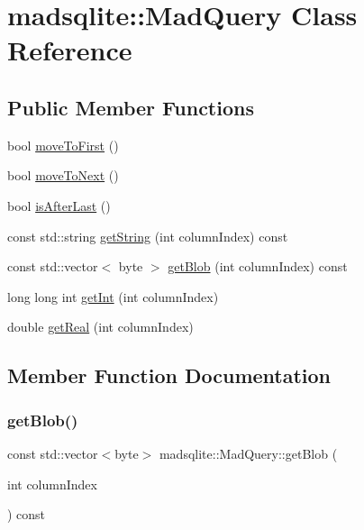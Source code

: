 \hypertarget{classmadsqlite_1_1_mad_query}{}\section{madsqlite\+:\+:Mad\+Query Class Reference}
\label{classmadsqlite_1_1_mad_query}
\subsection*{Public Member Functions}
\begin{DoxyCompactItemize}
\item 
bool \hyperlink{classmadsqlite_1_1_mad_query_a37a601031ecedf20e53b8c0f610f74b0}{move\+To\+First} ()
\item 
bool \hyperlink{classmadsqlite_1_1_mad_query_a2eecba50378a4577803aff41671829fe}{move\+To\+Next} ()
\item 
bool \hyperlink{classmadsqlite_1_1_mad_query_a0fa757aa8333e3fc53c57442bdf4cad7}{is\+After\+Last} ()
\item 
const std\+::string \hyperlink{classmadsqlite_1_1_mad_query_a63b55fe68d013c3d1fdade2391233cb9}{get\+String} (int column\+Index) const
\item 
const std\+::vector$<$ byte $>$ \hyperlink{classmadsqlite_1_1_mad_query_ade5b4bc30c7876eeeb62e2f0bb8fc111}{get\+Blob} (int column\+Index) const
\item 
long long int \hyperlink{classmadsqlite_1_1_mad_query_ab04d59c89fccfd773f77276219f4d376}{get\+Int} (int column\+Index)
\item 
double \hyperlink{classmadsqlite_1_1_mad_query_ab1d5375285453976e078f320c73e224f}{get\+Real} (int column\+Index)
\end{DoxyCompactItemize}


\subsection{Member Function Documentation}
\hypertarget{classmadsqlite_1_1_mad_query_ade5b4bc30c7876eeeb62e2f0bb8fc111}{}\label{classmadsqlite_1_1_mad_query_ade5b4bc30c7876eeeb62e2f0bb8fc111} 
\subsubsection{\texorpdfstring{get\+Blob()}{getBlob()}}
{\footnotesize\ttfamily const std\+::vector$<$byte$>$ madsqlite\+::\+Mad\+Query\+::get\+Blob (\begin{DoxyParamCaption}\item[{int}]{column\+Index }\end{DoxyParamCaption}) const}


